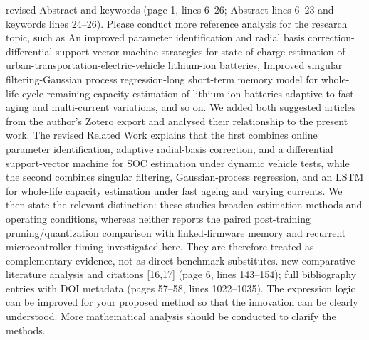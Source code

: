 {} revised Abstract and keywords (page 1, lines 6--26; Abstract lines 6--23 and keywords lines 24--26).\markdownRendererInterblockSeparator
{}
\markdownRendererSectionEnd \markdownRendererSectionBegin
{}\markdownRendererInterblockSeparator
{}\markdownRendererBlockQuoteBegin
Please conduct more reference analysis for the research topic, such as An improved parameter identification and radial basis correction-differential support vector machine strategies for state-of-charge estimation of urban-transportation-electric-vehicle lithium-ion batteries, Improved singular filtering-Gaussian process regression-long short-term memory model for whole-life-cycle remaining capacity estimation of lithium-ion batteries adaptive to fast aging and multi-current variations, and so on.\markdownRendererBlockQuoteEnd \markdownRendererInterblockSeparator
{} We added both suggested articles from the author's Zotero export and analysed their relationship to the present work. The revised Related Work explains that the first combines online parameter identification, adaptive radial-basis correction, and a differential support-vector machine for SOC estimation under dynamic vehicle tests, while the second combines singular filtering, Gaussian-process regression, and an LSTM for whole-life capacity estimation under fast ageing and varying currents. We then state the relevant distinction: these studies broaden estimation methods and operating conditions, whereas neither reports the paired post-training pruning/quantization comparison with linked-firmware memory and recurrent microcontroller timing investigated here. They are therefore treated as complementary evidence, not as direct benchmark substitutes.\markdownRendererParagraphSeparator
{} new comparative literature analysis and citations [16,17] (page 6, lines 143--154); full bibliography entries with DOI metadata (pages 57--58, lines 1022--1035).\markdownRendererInterblockSeparator
{}
\markdownRendererSectionEnd \markdownRendererSectionBegin
{}\markdownRendererInterblockSeparator
{}\markdownRendererBlockQuoteBegin
The expression logic can be improved for your proposed method so that the innovation can be clearly understood. More mathematical analysis should be conducted to clarify the methods.\markdownRendererBlockQuoteEnd \markdownRendererInterblockSeparator
